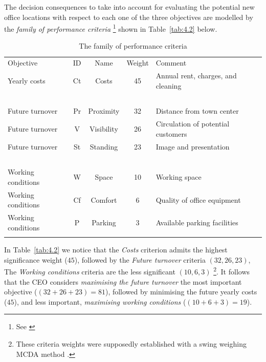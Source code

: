 The decision consequences to take into account for evaluating the potential new office locations with respect to each one of the three objectives are modelled by the \emph{family of performance criteria} \footnote{See \citealp{ROY-2000}} shown in Table~\vref{tab:4.2} below.
\begin{table}[ht]
\caption{The family of performance criteria}
\label{tab:4.2}       %
\begin{center}
    \begin{tabular}{l|c|c|c|l}
      \svhline\noalign{\smallskip}
      Objective & ID & Name & Weight & Comment\\
      \noalign{\smallskip}\hline\noalign{\smallskip}
    Yearly costs  &       Ct &   Costs &  45 &     Annual rent, charges, and cleaning\\
    \             &  \      & \        &  \ & \ \\
    Future turnover   &   Pr  & Proximity  & 32 & Distance from town center\\
    Future turnover   &   V  &  Visibility & 26 & Circulation of potential customers \\
    Future turnover   &   St &   Standing & 23 &   Image and presentation\\
    \                 &   \   & \          &  \ & \  \\
    Working conditions &  W  &  Space   &   10 &  Working space\\
    Working conditions &  Cf &  Comfort  &  6 &  Quality of office equipment\\
    Working conditions &  P  &  Parking  &  3 &  Available parking facilities\\
      \noalign{\smallskip}\hline
    \end{tabular}   
  \end{center}
\end{table}

In Table~\vref{tab:4.2} we notice that the \emph{Costs} criterion admits the highest significance weight ($45$), followed by the \emph{Future turnover} criteria $(32, 26, 23)$, The \emph{Working conditions} criteria are the less significant $(10, 6, 3)$ \footnote{These criteria weights were supposedly established with a swing weighing MCDA method \citep{KEE-1976}.}. It follows that the CEO considers \emph{maximising the future turnover} the most important objective ($(32 + 26+ 23) = 81$), followed by minimising the future yearly costs ($45$), and less important, \emph{maximising working conditions} ($(10 + 6 + 3) = 19$). 

